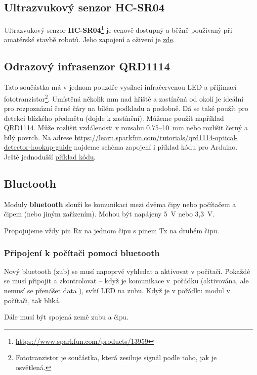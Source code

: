 \label{hcsr04} \subsection{Ultrazvukový senzor HC-SR04} 

Ultrazvukový senzor {\bf HC-SR04}\footnote{\url{https://www.sparkfun.com/products/13959}}  je cenově dostupný a běžně používaný při amatérské stavbě robotů. 
Jeho zapojení a oživení je 
  \href{https://randomnerdtutorials.com/complete-guide-for-ultrasonic-sensor-hc-sr04/}{zde}.

\subsection{Odrazový infrasenzor QRD1114}

  \label{qrd1114} Tato součástka má v jednom pouzdře vysílací infračervenou LED a přijímací fototranzistor\footnote{Fototranzistor je součástka, která zesiluje signál podle toho, jak je osvětlená.}. Umístěná několik mm nad hřiště a zastíněná od okolí je ideální pro rozpoznázní  černé čáry na bílém podkladu a podobně. Dá se také použít pro detekci blízkého předmětu (dojde k zastínění).
Můžeme použít například QRD1114. Může rozlišit vzdálenosti v rozsahu 0.75--10~mm nebo rozlišit černý a bílý povrch.  
Na adrese
\url{https://learn.sparkfun.com/tutorials/qrd1114-optical-detector-hookup-guide} najdeme schéma zapojení i příklad kódu pro Arduino. Ještě jednodušší \hyperref[prog:qrd1114]{příklad kódu}.

\subsection{Bluetooth} 

\hypertarget{bluetooth}{} Moduly {\bf bluetooth} slouží ke komunikaci mezi dvěma čipy nebo počítačem a čipem (nebo jiným zařízením).
Mohou být napájeny 5~V nebo 3,3~V. 
\label{bluetooth} 

Propojujeme vždy pin Rx na jednom čipu s pinem Tx na druhém čipu. 

\subsubsection*{Připojení k počítači pomocí bluetooth}

Nový bluetooth (zub) se musí napoprvé vyhledat a aktivovat v počítači. 
Pokaždé se musí připojit a zkontrolovat -- když je komunikace v~pořádku (aktivována, ale nemusí se přenášet data ), svítí LED na zubu. 
Když je v pořádku modul v počítači, tak bliká.  

Dále musí být spojená země zubu a čipu.

